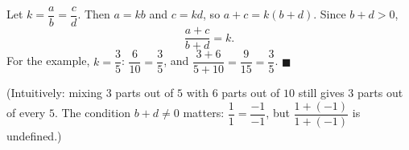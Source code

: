 Let $k=\dfrac ab=\dfrac cd$. Then $a=kb$ and $c=kd$, so $a+c=k(b+d)$. Since $b+d>0$,
\[\dfrac{a+c}{b+d}=k.\]
For the example, $k=\dfrac35$: $\dfrac6{10}=\dfrac35$, and $\dfrac{3+6}{5+10}=\dfrac9{15}=\dfrac35$. $\blacksquare$

(Intuitively: mixing $3$ parts out of $5$ with $6$ parts out of $10$ still gives $3$ parts out of every $5$. The condition $b+d\ne0$ matters: $\dfrac{1}{1}=\dfrac{-1}{-1}$, but $\dfrac{1+(-1)}{1+(-1)}$ is undefined.)
